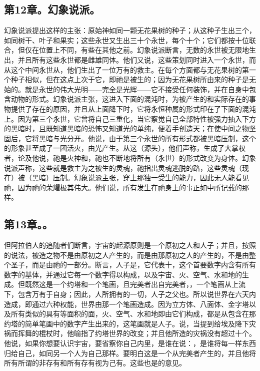 \subsection{第12章。幻象说派。}

幻象说派提出这样的主张：原始神如同一颗无花果树的种子；从这种子生出三个，如同树干、叶子和果实；这些永世又生出三十个永世，每个十个；它们都按十位联合，但仅在位置上不同，有些在其他之前。幻象说派断言，无数的永世被无限地生出，并且所有这些永世都是雌雄同体。他们又说，这些策划同时进入一个永世，而从这个中间永世从，他们生出了一位万有的救主。在每个方面都与无花果树的第一个种子相似，但在这点上次于它，即祂是被生的；因为无花果树所由来的种子是无始的。就是永世的伟大光明——完全是光辉——它不接受任何装饰，并在自身中包含动物的形式。幻象说派主张，这进入下面的混沌时，为被产生的和实际存在的事物提供了存在的原因，并且从上面降下时，它将永恒种属的形式印在了下面的混沌上。因为第三个永世，它曾将自己三重化，当它察觉自己全部特性被强力抽入下方的黑暗时，且既知道黑暗的恐怖又知道光的单纯，便着手创造天；在使中间之物坚固后，它将黑暗与光分开。他说，由于第三个永世的所有形式都被黑暗压制，这个的形象甚至成了一团活火，由光产生。从这（源头），他们声称，生成了大掌权者，论及他说，祂是火神和，祂也不断地将所有（永世）的形式改变为身体。幻象说派声称，这些就是救主为之被生的灵魂，祂指出灵魂逃脱的路，这些灵魂（现在）被（黑暗）压制。幻象说派主张，穿上那独一受生的能力，因此无人能看见祂，因为祂的荣耀极其伟大。他们说，所有发生在祂身上的事正如中所记载的那样。\par


\subsection{第13章。。}

但阿拉伯人的追随者们断言，宇宙的起源原则是一个原初之人和人子；并且，按照的说法，被造之物不是由原初之人产生的，而是由那原初之人的产生的，不是由整个圣子，而是由祂的一部分。断言，人子是，它代表十，这个首要数字内含有所有数字的基体，并通过它每一个数字得以构成，以及宇宙、火、空气、水和地的生成。但既然这是一个约塔和一个笔画，且完美者出自完美者，，一个笔画从上流下，包含万有于自身；因此，人所拥有的一切，人子之父也。所以说世界在六天内造成，即通过六种权能，世界由那一个笔画造成。因为立方体、八面体、金字塔以及所有类似的具有等面积的面，火、空气、水和地即由它们构成，都是从包含在那约塔的简单笔画中的数字产生出来的，这笔画就是人子。说，当提到给埃及降下灾祸而挥舞的棍杖时，他喻指了约塔世界的改变；并且他所造的灾祸没有超过十个。他说，如果你想要认识宇宙，要省察你自己内里，是谁在说：，是谁将每一样东西归给自己，如同另一个人为自己那样。要明白这是一个从完美者产生的，并且他将所有所谓的非存有和所有存有视为己有。这些也是的意见。\par

